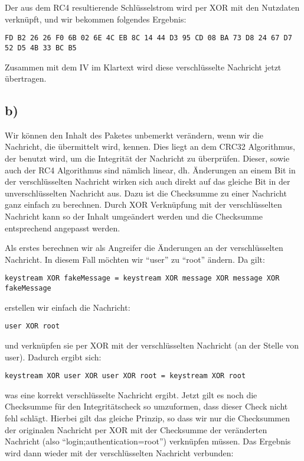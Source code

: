 \documentclass[10pt,a4paper]{article}
\begin{document}
Der aus dem RC4 resultierende Schlüsselstrom wird per XOR mit den Nutzdaten verknüpft, und wir bekommen folgendes Ergebnis:

\begin{verbatim}
FD B2 26 26 F0 6B 02 6E 4C EB 8C 14 44 D3 95 CD 08 BA 73 D8 24 67 D7 52 D5 4B 33 BC B5 
\end{verbatim}

Zusammen mit dem IV im Klartext wird diese verschlüsselte Nachricht jetzt übertragen.

\subsection*{b)}

Wir können den Inhalt des Paketes unbemerkt verändern, wenn wir die Nachricht, die übermittelt wird, kennen. Dies liegt an dem CRC32 Algorithmus, der benutzt wird, um die Integrität der Nachricht zu überprüfen. Dieser, sowie auch der RC4 Algorithmus sind nämlich linear, dh. Änderungen an einem Bit in der verschlüsselten Nachricht wirken sich auch direkt auf das gleiche Bit in der unverschlüsselten Nachricht aus. Dazu ist die Checksumme zu einer Nachricht ganz einfach zu berechnen. Durch XOR Verknüpfung mit der verschlüsselten Nachricht kann so der Inhalt umgeändert werden und die Checksumme entsprechend angepasst werden.

Als erstes berechnen wir als Angreifer die Änderungen an der verschlüsselten Nachricht. In diesem Fall möchten wir "`user"' zu "`root"' ändern. Da gilt:

\begin{verbatim}
keystream XOR fakeMessage = keystream XOR message XOR message XOR fakeMessage
\end{verbatim}

erstellen wir einfach die Nachricht:

\begin{verbatim}
user XOR root
\end{verbatim}

und verknüpfen sie per XOR mit der verschlüsselten Nachricht (an der Stelle von user).
Dadurch ergibt sich:

\begin{verbatim}
keystream XOR user XOR user XOR root = keystream XOR root
\end{verbatim}

was eine korrekt verschlüsselte Nachricht ergibt. Jetzt gilt es noch die Checksumme für den Integritätscheck so umzuformen, dass dieser Check nicht fehl schlägt. Hierbei gilt das gleiche Prinzip, so dass wir nur die Checksummen der originalen Nachricht per XOR mit der Checksumme der veränderten Nachricht (also "`login;authentication=root"') verknüpfen müssen. Das Ergebnis wird dann wieder mit der verschlüsselten Nachricht verbunden:
\end{document}

